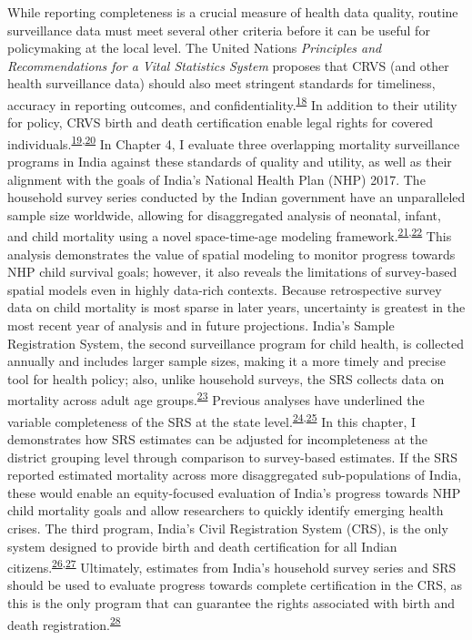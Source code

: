 \documentclass[
]{article}
\begin{document}
While reporting completeness is a crucial measure of health data quality, routine surveillance data must meet several other criteria before it can be useful for policymaking at the local level. The United Nations \emph{Principles and Recommendations for a Vital Statistics System} proposes that CRVS (and other health surveillance data) should also meet stringent standards for timeliness, accuracy in reporting outcomes, and confidentiality.\textsuperscript{\protect\hyperlink{ref-UnitedNationsStatisticsDivision2014}{18}} In addition to their utility for policy, CRVS birth and death certification enable legal rights for covered individuals.\textsuperscript{\protect\hyperlink{ref-Setel2007}{19},\protect\hyperlink{ref-Duryea2006}{20}} In Chapter 4, I evaluate three overlapping mortality surveillance programs in India against these standards of quality and utility, as well as their alignment with the goals of India's National Health Plan (NHP) 2017. The household survey series conducted by the Indian government have an unparalleled sample size worldwide, allowing for disaggregated analysis of neonatal, infant, and child mortality using a novel space-time-age modeling framework.\textsuperscript{\protect\hyperlink{ref-Dandona2016}{21},\protect\hyperlink{ref-Dandona2020}{22}} This analysis demonstrates the value of spatial modeling to monitor progress towards NHP child survival goals; however, it also reveals the limitations of survey-based spatial models even in highly data-rich contexts. Because retrospective survey data on child mortality is most sparse in later years, uncertainty is greatest in the most recent year of analysis and in future projections. India's Sample Registration System, the second surveillance program for child health, is collected annually and includes larger sample sizes, making it a more timely and precise tool for health policy; also, unlike household surveys, the SRS collects data on mortality across adult age groups.\textsuperscript{\protect\hyperlink{ref-CensusofIndia2017}{23}} Previous analyses have underlined the variable completeness of the SRS at the state level.\textsuperscript{\protect\hyperlink{ref-Bhat2002}{24},\protect\hyperlink{ref-Mahapatra2010}{25}} In this chapter, I demonstrates how SRS estimates can be adjusted for incompleteness at the district grouping level through comparison to survey-based estimates. If the SRS reported estimated mortality across more disaggregated sub-populations of India, these would enable an equity-focused evaluation of India's progress towards NHP child mortality goals and allow researchers to quickly identify emerging health crises. The third program, India's Civil Registration System (CRS), is the only system designed to provide birth and death certification for all Indian citizens.\textsuperscript{\protect\hyperlink{ref-ParliamentoftheRepublicofIndia1969}{26},\protect\hyperlink{ref-Mohanty2018}{27}} Ultimately, estimates from India's household survey series and SRS should be used to evaluate progress towards complete certification in the CRS, as this is the only program that can guarantee the rights associated with birth and death registration.\textsuperscript{\protect\hyperlink{ref-Abouzahr2007}{28}}
\end{document}
